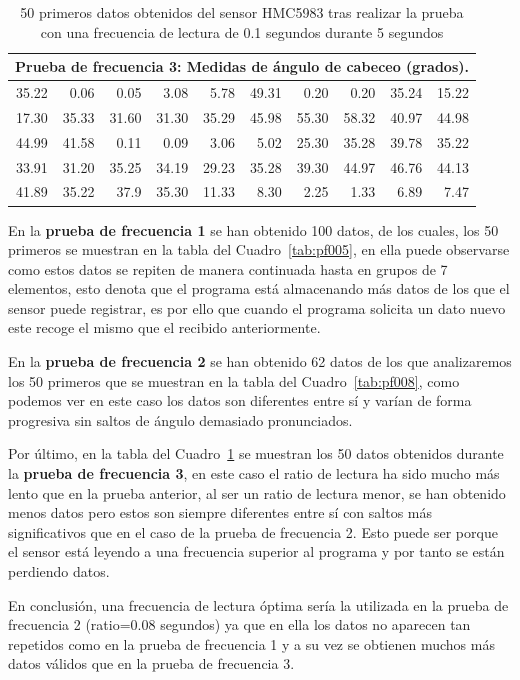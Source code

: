 \begin{table}[htbp]
  \centering
  {\sffamily\small
  \begin{tabular}{|*{10}{r|}}
      \hline
    \multicolumn{10}{c}{\textbf{Prueba de frecuencia 3}: Medidas de ángulo de cabeceo (grados).}\\
    \hline
    35.22 & 0.06 & 0.05 & 3.08 & 5.78 & 49.31 & 0.20 & 0.20 & 35.24 & 15.22 \\
    \hline
    17.30 & 35.33 & 31.60 & 31.30 & 35.29 & 45.98 & 55.30 & 58.32 & 40.97 & 44.98\\
    \hline
    44.99 & 41.58 & 0.11 & 0.09 & 3.06 & 5.02 & 25.30 & 35.28 & 39.78 & 35.22\\
    \hline
    33.91 & 31.20 & 35.25 & 34.19 & 29.23 & 35.28 & 39.30 & 44.97 & 46.76 & 44.13\\
    \hline
    41.89 & 35.22 & 37.9 & 35.30 & 11.33 & 8.30 & 2.25 & 1.33 & 6.89 & 7.47\\
    \hline
  \end{tabular}
  } %
  \caption[Prueba de frecuencia 3]{50 primeros datos obtenidos del sensor HMC5983 tras realizar la prueba con una frecuencia de lectura de 0.1 segundos durante 5 segundos}\label{tab:pf01}
\end{table}

\clearpage

En la \textbf{prueba de frecuencia 1} se han obtenido 100 datos, de los cuales, los 50 primeros se muestran en la tabla del Cuadro~\ref{tab:pf005}, en ella puede observarse como estos datos se repiten de manera continuada hasta en grupos de 7 elementos, esto denota que el programa está almacenando más datos de los que el sensor puede registrar, es por ello que cuando el programa solicita un dato nuevo este recoge el mismo que el recibido anteriormente.

En la \textbf{prueba de frecuencia 2} se han obtenido 62 datos de los que analizaremos los 50 primeros que se muestran en la tabla del Cuadro~\ref{tab:pf008}, como podemos ver en este caso los datos son diferentes entre sí y varían de forma progresiva sin saltos de ángulo demasiado pronunciados. 

Por último, en la tabla del Cuadro~\ref{tab:pf01} se muestran los 50 datos obtenidos durante la \textbf{prueba de frecuencia 3}, en este caso el ratio de lectura ha sido mucho más lento que en la prueba anterior, al ser un ratio de lectura menor, se han obtenido menos datos pero estos son siempre diferentes entre sí con saltos más significativos que en el caso de la prueba de frecuencia 2. Esto puede ser porque el sensor está leyendo a una frecuencia superior al programa y por tanto se están perdiendo datos.

En conclusión, una frecuencia de lectura óptima sería la utilizada en la prueba de frecuencia 2 (ratio=0.08 segundos) ya que en ella los datos no aparecen tan repetidos como en la prueba de frecuencia 1 y a su vez se obtienen muchos más datos válidos que en la prueba de frecuencia 3.